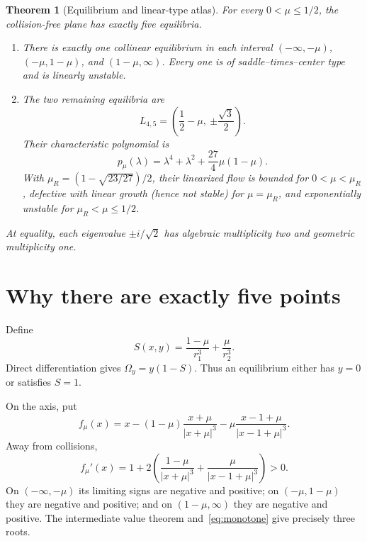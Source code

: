 \documentclass[10pt]{article}
\newtheorem{theorem}{Theorem}
\newcommand{\Om}{\Omega}
\begin{document}
\begin{theorem}[Equilibrium and linear-type atlas]\label{thm:main}
For every $0<\mu\leq1/2$, the collision-free plane has exactly five
equilibria.
\begin{enumerate}
 \item There is exactly one collinear equilibrium in each interval
 $(-\infty,-\mu)$, $(-\mu,1-\mu)$, and $(1-\mu,\infty)$.  Every one is of
 saddle--times--center type and is linearly unstable.
 \item The two remaining equilibria are
 \[
 L_{4,5}=\left(\frac12-\mu,\ \mathord\pm\frac{\sqrt3}{2}\right).
 \]
 Their characteristic polynomial is
 \begin{equation}\label{eq:trianglepoly}
 p_\mu(\lambda)=\lambda^4+\lambda^2+\frac{27}{4}\mu(1-\mu).
 \end{equation}
 With $\mu_R=(1-\sqrt{23/27})/2$, their linearized flow is bounded for
 $0<\mu<\mu_R$, defective with linear growth (hence not stable) for
 $\mu=\mu_R$, and exponentially unstable for $\mu_R<\mu\leq1/2$.
\end{enumerate}
At equality, each eigenvalue $\pm i/\sqrt2$ has algebraic multiplicity two
and geometric multiplicity one.
\end{theorem}

\section{Why there are exactly five points}
Define
\begin{equation}\label{eq:S}
 S(x,y)=\frac{1-\mu}{r_1^3}+\frac{\mu}{r_2^3}.
\end{equation}
Direct differentiation gives $\Om_y=y(1-S)$.  Thus an equilibrium either has
$y=0$ or satisfies $S=1$.

On the axis, put
\begin{equation}\label{eq:f}
 f_\mu(x)=x-(1-\mu)\frac{x+\mu}{|x+\mu|^3}
              -\mu\frac{x-1+\mu}{|x-1+\mu|^3}.
\end{equation}
Away from collisions,
\begin{equation}\label{eq:monotone}
 f_\mu'(x)=1+2\left(\frac{1-\mu}{|x+\mu|^3}
                    +\frac{\mu}{|x-1+\mu|^3}\right)>0.
\end{equation}
On $(-\infty,-\mu)$ its limiting signs are negative and positive; on
$(-\mu,1-\mu)$ they are negative and positive; and on
$(1-\mu,\infty)$ they are negative and positive.  The intermediate value
theorem and~\eqref{eq:monotone} give precisely three roots.
\end{document}
